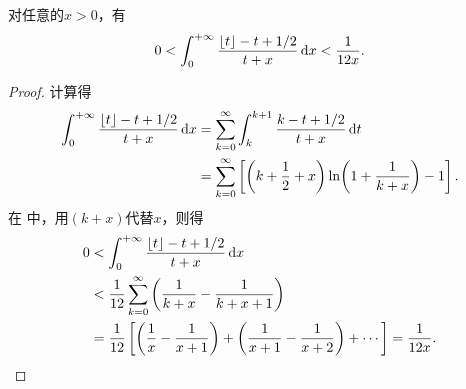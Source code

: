 \begin{lemma}\label{theorem:定积分.伽马函数的斯特灵近似.引理2}
对任意的\(x>0\)，有\begin{equation}\label{equation:定积分.伽马函数的斯特灵近似.引理2}
0 < \int_0^{+\infty} \frac{\lfloor t\rfloor - t + 1/2}{t + x} \dd{x} < \frac{1}{12 x}.
\end{equation}
\begin{proof}
计算得\begin{align*}
\int_0^{+\infty} \frac{\lfloor t\rfloor - t + 1/2}{t + x} \dd{x}
&= \sum\limits_{k=0}^{\infty} \int_k^{k+1} \frac{k - t + 1/2}{t + x} \dd{t} \\
&= \sum\limits_{k=0}^{\infty} \left[
\left(k + \frac{1}{2} + x\right) \ln(1 + \frac{1}{k + x}) - 1
\right].
\end{align*}
在  中，用\((k+x)\)代替\(x\)，则得\begin{align*}
0 &< \int_0^{+\infty} \frac{\lfloor t\rfloor - t + 1/2}{t + x} \dd{x} \\
&< \frac{1}{12} \sum\limits_{k=0}^{\infty} \left(\frac{1}{k+x} - \frac{1}{k+x+1}\right) \\
&= \frac{1}{12} \left[
\left(\frac{1}{x} - \frac{1}{x+1}\right) + \left(\frac{1}{x+1} - \frac{1}{x+2}\right) + \dotsb
\right]
= \frac{1}{12x}.
\qedhere
\end{align*}
\end{proof}
\end{lemma}

